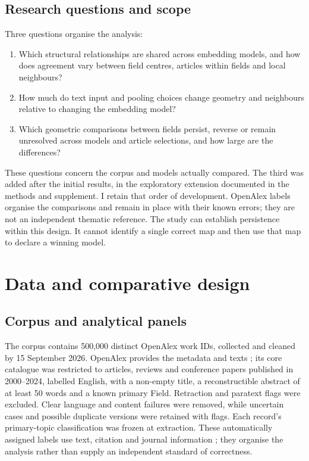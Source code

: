\documentclass[12pt]{article}
\begin{document}
\subsection{Research questions and scope}
Three questions organise the analysis:

\begin{enumerate}
\item[\textbf{RQ1.}] Which structural relationships are shared across embedding models, and how does agreement vary between field centres, articles within fields and local neighbours?
\item[\textbf{RQ2.}] How much do text input and pooling choices change geometry and neighbours relative to changing the embedding model?
\item[\textbf{RQ3.}] Which geometric comparisons between fields persist, reverse or remain unresolved across models and article selections, and how large are the differences?
\end{enumerate}

These questions concern the corpus and models actually compared. The third was added after the initial results, in the exploratory extension documented in the methods and supplement. I retain that order of development. OpenAlex labels organise the comparisons and remain in place with their known errors; they are not an independent thematic reference. The study can establish persistence within this design. It cannot identify a single correct map and then use that map to declare a winning model.


\section{Data and comparative design}
\subsection{Corpus and analytical panels}
The corpus contains 500,000 distinct OpenAlex work IDs, collected and cleaned by 15 September 2026. OpenAlex provides the metadata and texts \citep{priem2022openalex}; its core catalogue was restricted to articles, reviews and conference papers published in 2000--2024, labelled English, with a non-empty title, a reconstructible abstract of at least 50 words and a known primary Field. Retraction and paratext flags were excluded. Clear language and content failures were removed, while uncertain cases and possible duplicate versions were retained with flags. Each record's primary-topic classification was frozen at extraction. These automatically assigned labels use text, citation and journal information \citep{openalex2026topics}; they organise the analysis rather than supply an independent standard of correctness.
\end{document}
